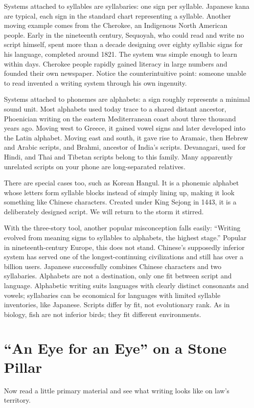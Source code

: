 Systems attached to syllables are syllabaries: one sign per syllable. Japanese kana are typical, each sign in the standard chart representing a syllable. Another moving example comes from the Cherokee, an Indigenous North American people. Early in the nineteenth century, Sequoyah, who could read and write no script himself, spent more than a decade designing over eighty syllabic signs for his language, completed around 1821. The system was simple enough to learn within days. Cherokee people rapidly gained literacy in large numbers and founded their own newspaper. Notice the counterintuitive point: someone unable to read invented a writing system through his own ingenuity.

Systems attached to phonemes are alphabets: a sign roughly represents a minimal sound unit. Most alphabets used today trace to a shared distant ancestor, Phoenician writing on the eastern Mediterranean coast about three thousand years ago. Moving west to Greece, it gained vowel signs and later developed into the Latin alphabet. Moving east and south, it gave rise to Aramaic, then Hebrew and Arabic scripts, and Brahmi, ancestor of India's scripts. Devanagari, used for Hindi, and Thai and Tibetan scripts belong to this family. Many apparently unrelated scripts on your phone are long-separated relatives.

There are special cases too, such as Korean Hangul. It is a phonemic alphabet whose letters form syllable blocks instead of simply lining up, making it look something like Chinese characters. Created under King Sejong in 1443, it is a deliberately designed script. We will return to the storm it stirred.

With the three-story tool, another popular misconception falls easily: ``Writing evolved from meaning signs to syllables to alphabets, the highest stage.'' Popular in nineteenth-century Europe, this does not stand. Chinese's supposedly inferior system has served one of the longest-continuing civilizations and still has over a billion users. Japanese successfully combines Chinese characters and two syllabaries. Alphabets are not a destination, only one fit between script and language. Alphabetic writing suits languages with clearly distinct consonants and vowels; syllabaries can be economical for languages with limited syllable inventories, like Japanese. Scripts differ by fit, not evolutionary rank. As in biology, fish are not inferior birds; they fit different environments.

\section{``An Eye for an Eye'' on a Stone Pillar}
Now read a little primary material and see what writing looks like on law's territory.

